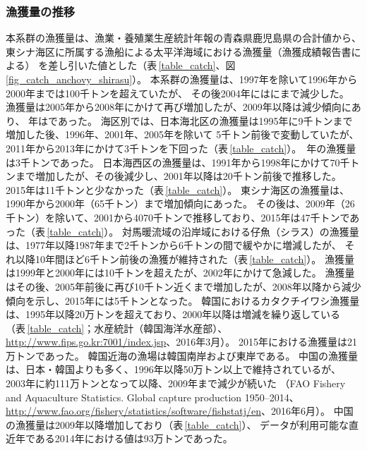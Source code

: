 \subsubsection{漁獲量の推移}
本系群の漁獲量は、漁業・養殖業生産統計年報の青森県鹿児島県の合計値から、
東シナ海区に所属する漁船による太平洋海域における漁獲量（漁獲成績報告書による）
を差し引いた値とした（表\,\ref{table_catch}、図\,\ref{fig_catch_anchovy_shirasu}）。
本系群の漁獲量は、1997年を除いて1996年から2000年までは100千トンを超えていたが、
その後2004年には\makeatletter{}\makeatother にまで減少した。
漁獲量は2005年から2008年にかけて再び増加したが、2009年以降は減少傾向にあり、
{\ThisYr}年は\makeatletter{}\makeatother であった。
%
%
 \textcolor[cmyk]{0,1,0,0}{海区別では、日本海北区の漁獲量は1995年に9千トンまで増加した後、1996年、2001年、2005年を除いて
 5千トン前後で変動していたが、2011年から2013年にかけて3千トンを下回った（表\,\ref{table_catch}）。
 {\ThisYr}\,年の漁獲量は3千トンであった。
日本海西区の漁獲量は、1991年から1998年にかけて70千トンまで増加したが、その後減少し、2001年以降は20千トン前後で推移した。
2015年は11千トンと少なかった（表\,\ref{table_catch}）。
東シナ海区の漁獲量は、1990年から2000年（65千トン）まで増加傾向にあった。
その後は、2009年（26千トン）を除いて、2001から4070千トンで推移しており、2015年は47千トンであった（表\,\ref{table_catch}）。
%
%
対馬暖流域の沿岸域における仔魚（シラス）の漁獲量は、1977年以降1987年まで2千トンから6千トンの間で緩やかに増減したが、
それ以降10年間ほど6千トン前後の漁獲が維持された（表\,\ref{table_catch}）。
漁獲量は1999年と2000年には10千トンを超えたが、2002年にかけて急減した。
漁獲量はその後、2005年前後に再び10千トン近くまで増加したが、2008年以降から減少傾向を示し、2015年には5千トンとなった。
%
%
韓国におけるカタクチイワシ漁獲量は、1995年以降20万トンを超えており、2000年以降は増減を繰り返している
（表\,\ref{table_catch}；水産統計（韓国海洋水産部）、\url{http://www.fips.go.kr:7001/index.jsp}、2016年3月）。
2015年における漁獲量は21万トンであった。
韓国近海の漁場は韓国南岸および東岸である\citep{Korfish2000}。
%
%
中国の漁獲量は、日本・韓国よりも多く、1996年以降50万トン以上で維持されているが、
2003年に約111万トンとなって以降、2009年まで減少が続いた
（FAO Fishery and Aquaculture Statistics. Global capture production 1950--2014、
\url{http://www.fao.org/fishery/statistics/software/fishstatj/en}、2016年6月）。
中国の漁獲量は2009年以降増加しており（表\,\ref{table_catch}）、
データが利用可能な直近年である2014年における値は93万トンであった。}
